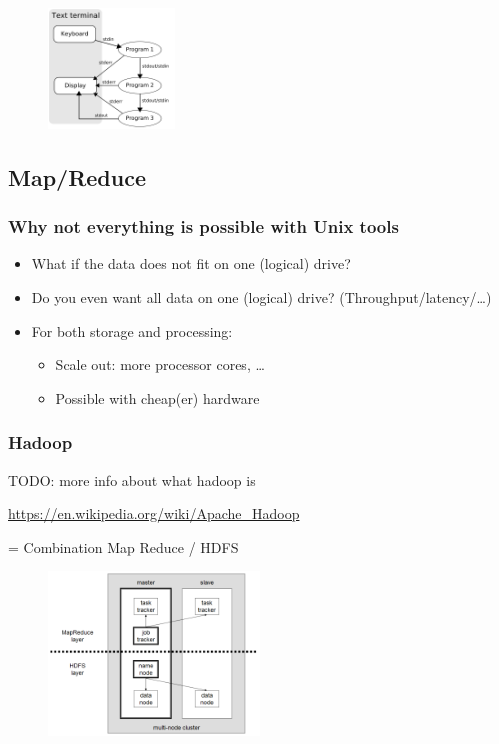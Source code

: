 \documentclass{article}
\begin{document}
\begin{figure}[H]
    \centering
    \includegraphics[width=0.3\textwidth]{linux-std2.png}
\end{figure}

\subsection{Map/Reduce}

\subsubsection{Why not everything is possible with Unix tools}

\begin{itemize}
    \item What if the data does not fit on one (logical) drive?
    \item Do you even want all data on one (logical) drive? (Throughput/latency/\dots)
    \item For both storage and processing:
    \begin{itemize}
        \item Scale out: more processor cores, \dots
        \item Possible with cheap(er) hardware
    \end{itemize}
\end{itemize}

\subsubsection{Hadoop}

TODO: more info about what hadoop is

\url{https://en.wikipedia.org/wiki/Apache_Hadoop}


= Combination Map Reduce / HDFS

\begin{figure}[H]
    \centering
    \includegraphics[width=0.5\textwidth]{hadoop.png}
\end{figure}
\end{document}
